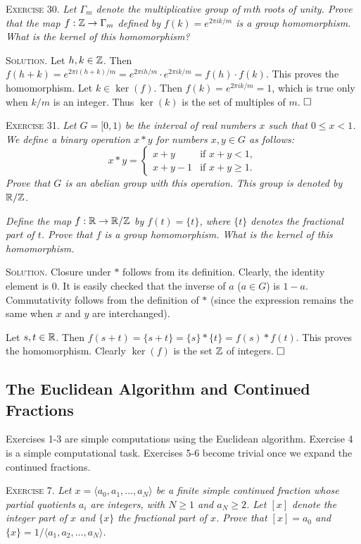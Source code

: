 \documentclass[11pt, leqno]{article}
\newcommand{\done}{\ensuremath{\hfill\square}}
\begin{document}
\textsc{Exercise 30}. \emph{Let $\Gamma_m$ denote the multiplicative group of $m$th roots of unity. Prove that the map $f: \mathbb{Z} \to \Gamma_m$ defined by $f(k) = e^{2\pi i k/m}$ is a group homomorphism. What is the kernel of this homomorphism?}

\textsc{Solution}. Let $h, k \in \mathbb{Z}$. Then $f(h+k) = e^{2\pi i (h+k)/m} = e^{2\pi i h/m}\cdot e^{2\pi i k/m} = f(h)\cdot f(k)$. This proves the homomorphism. Let $k\in \ker(f)$. Then $f(k) = e^{2\pi i k/m} = 1$, which is true only when $k/m$ is an integer. Thus $\ker(k)$ is the set of multiples of $m$. \done

\textsc{Exercise 31}. \emph{Let $G = [0,1)$ be the interval of real numbers $x$ such that $0\leq x < 1$. We define a binary operation $x*y$ for numbers $x,y\in G$ as follows: 
\begin{displaymath}
x*y =
\begin{cases}
  x + y & \text{if } x+y < 1,\\
  x + y - 1 & \text{if } x+y \geq 1.
\end{cases}
\end{displaymath}
Prove that $G$ is an abelian group with this operation. This group is denoted by $\mathbb{R}/\mathbb{Z}$.}

\emph{Define the map $f: \mathbb{R} \to \mathbb{R}/\mathbb{Z}$ by $f(t) = \{t\}$, where $\{t\}$ denotes the fractional part of $t$. Prove that $f$ is a group homomorphism. What is the kernel of this homomorphism.}

\textsc{Solution}. Closure under $*$ follows from its definition. Clearly, the identity element is $0$. It is easily checked that the inverse of $a$ ($a\in G$) is $1-a$. Commutativity follows from the definition of $*$ (since the expression remains the same when $x$ and $y$ are interchanged).

Let $s, t \in \mathbb{R}$. Then $f(s+t) = \{s + t\} = \{s\} * \{t\} = f(s)*f(t)$. This proves the homomorphism. Clearly $\ker(f)$ is the set $\mathbb{Z}$ of integers. \done

\subsection{The Euclidean Algorithm and Continued Fractions}

Exercises 1-3 are simple computations using the Euclidean algorithm. Exercise 4 is a simple computational task. Exercises 5-6 become trivial once we expand the continued fractions.

\textsc{Exercise 7}. \emph{Let $x=\langle a_0, a_1,\ldots,a_N \rangle$ be a finite simple continued fraction whose partial quotients $a_i$ are integers, with $N \geq 1$ and $a_N \geq 2$. Let $[x]$ denote the integer part of $x$ and $\{x\}$ the fractional part of $x$. Prove that $[x]=a_0$ and $\{x\} = 1/\langle a_1, a_2,\ldots,a_N \rangle$.}
\end{document}
